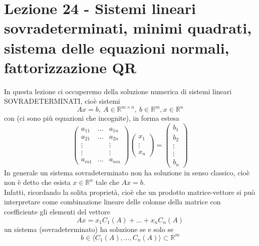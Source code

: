 \documentclass[12pt,a4paper]{article}
\begin{document}
\section[Lezione 24 - Sistemi lineari sovradeterminati, fattorizzazione QR]{Lezione 24 - Sistemi lineari sovradeterminati, minimi quadrati, sistema delle equazioni normali, fattorizzazione QR}

In questa lezione ci occuperemo della soluzione numerica di sistemi lineari SOVRADETERMINATI, cioè sistemi
\begin{equation*}
    Ax=b, \ A\in \mathbb{R}^{m\times n}, \ b\in \mathbb{R}^m, x\in \mathbb{R}^n
\end{equation*}
con  (ci sono più equazioni che incognite), in forma estesa
\begin{equation*}
    \begin{pmatrix}
        a_{11} & \dots & a_{1n} \\
        a_{21} & \dots & a_{2n} \\
        \vdots &  & \vdots \\
        \vdots &  & \vdots \\
        a_{m1} & \dots & a_{mn} 
    \end{pmatrix}
    \begin{pmatrix}
        x_1 \\
        \vdots \\
        x_n
    \end{pmatrix}=
    \begin{pmatrix}
        b_1 \\
        b_2 \\
        \vdots \\
        \vdots \\
        b_n
    \end{pmatrix}
\end{equation*}
In generale un sistema sovradeterminato non ha soluzione in senso classico, cioè non è detto che esista $x \in \mathbb{R}^n$ tale che $Ax=b$. \\
Infatti, ricordando la solita proprietà, cioè che un prodotto matrice-vettore si può interpretare come combinazione lineare delle colonne della matrice con coefficiente gli elementi del vettore
\begin{equation*}
    Ax=x_1 C_1(A) + \dots + x_n C_n(A)
\end{equation*}
un sistema (sovradeterminato) ha soluzione se e solo se
\begin{equation*}
    b \in \langle C_1(A), \dots, C_n(A) \rangle \subset \mathbb{R}^m
\end{equation*}
\end{document}

